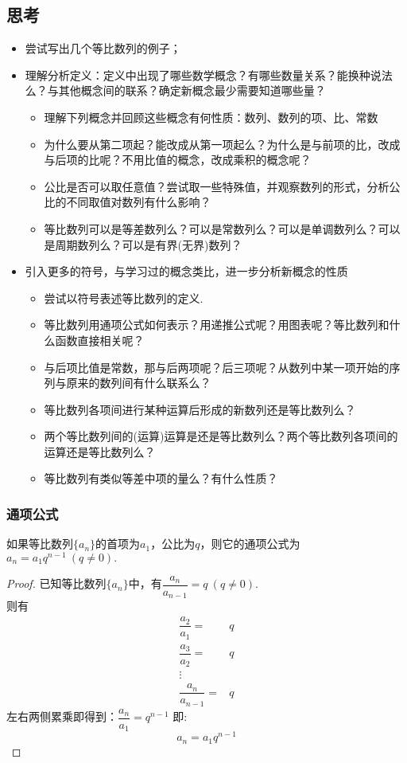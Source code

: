   \subsection*{思考}
      \begin{itemize}[leftmargin=*]
        \kaishu
        \item 尝试写出几个等比数列的例子；
        \item 理解分析定义：定义中出现了哪些数学概念？有哪些数量关系？能换种说法么？与其他概念间的联系？确定新概念最少需要知道哪些量？
          \begin{itemize}%
            \item 理解下列概念并回顾这些概念有何性质：数列、数列的项、比、常数
            \item 为什么要从第二项起？能改成从第一项起么？为什么是与前项的比，改成与后项的比呢？不用比值的概念，改成乘积的概念呢？
            \item 公比是否可以取任意值？尝试取一些特殊值，并观察数列的形式，分析公比的不同取值对数列有什么影响？
            \item 等比数列可以是等差数列么？可以是常数列么？可以是单调数列么？可以是周期数列么？可以是有界(无界)数列？
          \end{itemize}
        \item 引入更多的符号，与学习过的概念类比，进一步分析新概念的性质
          \begin{itemize}%
            \item 尝试以符号表述等比数列的定义.
            \item 等比数列用通项公式如何表示？用递推公式呢？用图表呢？等比数列和什么函数直接相关呢？
            \item 与后项比值是常数，那与后两项呢？后三项呢？从数列中某一项开始的序列与原来的数列间有什么联系么？
            \item 等比数列各项间进行某种运算后形成的新数列还是等比数列么？
            \item 两个等比数列间的(运算)运算是还是等比数列么？两个等比数列各项间的运算还是等比数列么？
            \item 等比数列有类似等差中项的量么？有什么性质？
          \end{itemize}
      \end{itemize}
  \subsubsection{通项公式}如果等比数列$\{a_n\}$的首项为$a_1$，公比为$ q $，则它的通项公式为$ a_n=a_1q^{n-1}~(q\ne0). $
    \begin{proof}
      已知等比数列$\{a_n\}$中，有$\dfrac{a_n}{a_{n-1}}=q~(q\ne0)$.\\
      则有$$ \begin{aligned}
      \dfrac{a_2}{a_1}=&q\\
      \dfrac{a_3}{a_2}=&q\\
      \vdots&\\
      \dfrac{a_n}{a_{n-1}}=&q
      \end{aligned}
      $$
      左右两侧累乘即得到：$\dfrac{a_n}{a_1}=q^{n-1}$
      即:$$ a_n=a_1q^{n-1} $$
    \end{proof}
